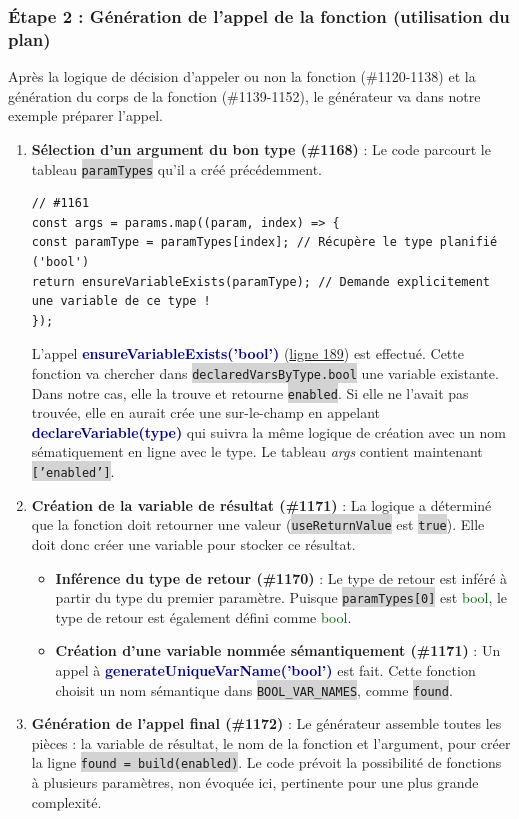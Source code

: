 \documentclass[11pt,a4paper]{article}
\newcommand{\code}[1]{\colorbox{lightgray}{\texttt{\small #1}}}
\newcommand{\var}[1]{\textit{#1}}
\newcommand{\vartype}[1]{\textcolor{darkgreen}{#1}}
\newcommand{\methodname}[1]{\textbf{\textcolor{darkblue}{#1}}}
\begin{document}
\subsubsection*{Étape 2 : Génération de l'appel de la fonction (utilisation du plan)}
Après la logique de décision d'appeler ou non la fonction (\#1120-1138) et la génération du corps de la fonction (\#1139-1152), le générateur va dans notre exemple préparer l'appel.
\begin{enumerate}
\item \textbf{Sélection d'un argument du bon type (\#1168)} : Le code parcourt le tableau \code{paramTypes} qu'il a créé précédemment.
\begin{verbatim}
// #1161
const args = params.map((param, index) => {
const paramType = paramTypes[index]; // Récupère le type planifié ('bool')
return ensureVariableExists(paramType); // Demande explicitement une variable de ce type !
});
\end{verbatim}
L'appel \methodname{ensureVariableExists('bool')} (\href{https://github.com/edu-mateescoj/gyminf/blob/main/static/js/code-generator.js#L189}{ligne 189}) est effectué. Cette fonction va chercher dans \code{declaredVarsByType.bool} une variable existante. Dans notre cas, elle la trouve et retourne \code{enabled}. Si elle ne l'avait pas trouvée, elle en aurait crée une
sur-le-champ en appelant \methodname{declareVariable(type)} qui suivra la même logique de création avec un nom sématiquement en ligne avec le type. Le tableau \var{args} contient maintenant \code{['enabled']}.

\item \textbf{Création de la variable de résultat (\#1171)} : La logique a déterminé que la fonction doit retourner une valeur (\code{useReturnValue} est \code{true}). Elle doit donc créer une variable pour stocker ce résultat.
\begin{itemize}
    \item \textbf{Inférence du type de retour (\#1170)} : Le type de retour est inféré à partir du type du premier paramètre. Puisque \code{paramTypes[0]} est \vartype{bool}, le type de retour est également défini comme \vartype{bool}.
    \item \textbf{Création d'une variable nommée sémantiquement (\#1171)} : Un appel à \methodname{generateUniqueVarName('bool')} est fait. Cette fonction choisit un nom sémantique dans \code{BOOL\_VAR\_NAMES}, comme \code{found}.
\end{itemize}

\item \textbf{Génération de l'appel final (\#1172)} : Le générateur assemble toutes les pièces : la variable de résultat, le nom de la fonction et l'argument, pour créer la ligne \code{found = build(enabled)}. Le code prévoit la possibilité de fonctions à plusieurs paramètres, non évoquée ici, pertinente pour une plus grande complexité.
\end{enumerate}
\end{document}
